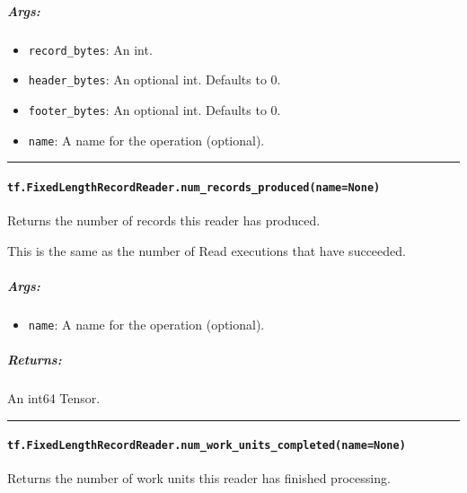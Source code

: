 \subparagraph{Args: }\label{args-36}

\begin{itemize}
\tightlist
\item
  \texttt{record\_bytes}: An int.
\item
  \texttt{header\_bytes}: An optional int. Defaults to 0.
\item
  \texttt{footer\_bytes}: An optional int. Defaults to 0.
\item
  \texttt{name}: A name for the operation (optional).
\end{itemize}

\begin{center}\rule{0.5\linewidth}{\linethickness}\end{center}

\paragraph{\texorpdfstring{\texttt{tf.FixedLengthRecordReader.num\_records\_produced(name=None)}
}{tf.FixedLengthRecordReader.num\_records\_produced(name=None) }}\label{tf.fixedlengthrecordreader.numux5frecordsux5fproducednamenone}

Returns the number of records this reader has produced.

This is the same as the number of Read executions that have succeeded.

\subparagraph{Args: }\label{args-37}

\begin{itemize}
\tightlist
\item
  \texttt{name}: A name for the operation (optional).
\end{itemize}

\subparagraph{Returns: }\label{returns-31}

An int64 Tensor.

\begin{center}\rule{0.5\linewidth}{\linethickness}\end{center}

\paragraph{\texorpdfstring{\texttt{tf.FixedLengthRecordReader.num\_work\_units\_completed(name=None)}
}{tf.FixedLengthRecordReader.num\_work\_units\_completed(name=None) }}\label{tf.fixedlengthrecordreader.numux5fworkux5funitsux5fcompletednamenone}

Returns the number of work units this reader has finished processing.

